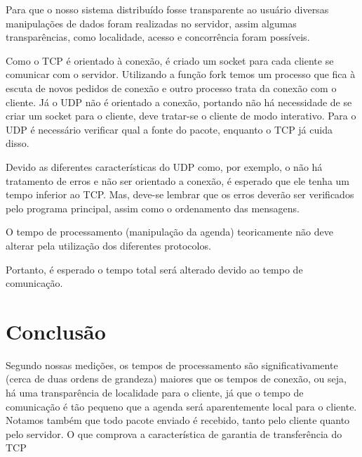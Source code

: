\documentclass[10pt,a4paper]{article}
\begin{document}
Para que o nosso sistema distribuído fosse transparente ao usuário
diversas manipulações de dados foram realizadas no servidor, assim
algumas transparências, como localidade, acesso e concorrência foram
possíveis.

Como o TCP é orientado à conexão, é criado um socket para cada cliente
se comunicar com o servidor. Utilizando a função fork temos um
processo que fica à escuta de novos pedidos de conexão e outro
processo trata da conexão com o cliente. 
Já o UDP não é orientado a
conexão, portando não há necessidade de se criar um socket para o
cliente, deve tratar-se o cliente de modo interativo.
Para o UDP é necessário verificar qual a fonte do pacote, enquanto o
TCP já cuida disso.


Devido as diferentes características do UDP como, por exemplo, o não há tratamento de
erros e  não ser orientado a conexão, é esperado que ele tenha
um tempo inferior ao TCP. Mas, deve-se lembrar que os erros deverão
ser verificados pelo programa principal, assim como o ordenamento das mensagens.

O tempo de processamento (manipulação da agenda) teoricamente não deve
alterar pela utilização dos diferentes protocolos.

Portanto, é esperado o tempo total será alterado devido ao tempo de comunicação.

\section{Conclusão}
Segundo nossas medições, os tempos de processamento são significativamente (cerca de duas ordens de grandeza) maiores que os tempos de conexão, ou seja, há uma transparência de localidade para o cliente, já que o tempo de comunicação é tão pequeno que a agenda será aparentemente local para o cliente.
Notamos também que todo pacote enviado é recebido, tanto pelo cliente quanto pelo servidor. O que comprova a característica de garantia de transferência do TCP


\begin{small}
  
\end{small}
\end{document}
